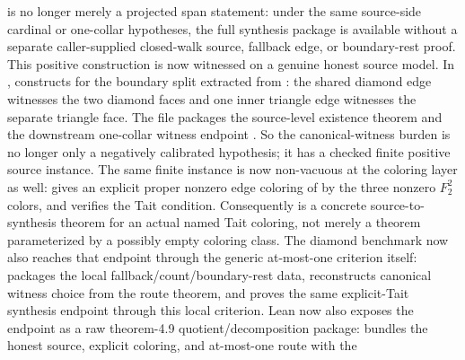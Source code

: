 \documentclass[11pt]{article}
\begin{document}
is no longer merely a projected span statement: under the same source-side
cardinal or one-collar hypotheses, the full synthesis package is available
without a separate caller-supplied closed-walk source, fallback edge, or
boundary-rest proof.
This positive construction is now witnessed on a genuine honest source model.
In ,
 constructs
for the boundary split extracted from
: the shared diamond
edge witnesses the two diamond faces and one inner triangle edge witnesses the
separate triangle face.  The file packages the source-level existence theorem
and the downstream one-collar witness endpoint
.
So the canonical-witness burden is no longer only a negatively calibrated
hypothesis; it has a checked finite positive source instance.
The same finite instance is now non-vacuous at the coloring layer as well:
 gives an explicit proper nonzero
edge coloring of  by the three nonzero
\(F_2^2\) colors, and
 verifies the Tait condition.
Consequently
is a concrete source-to-synthesis theorem for an actual named Tait coloring,
not merely a theorem parameterized by a possibly empty coloring class.
The diamond benchmark now also reaches that endpoint through the generic
at-most-one criterion itself:
packages the local fallback/count/boundary-rest data,
reconstructs canonical witness choice from the route theorem, and
proves the same explicit-Tait synthesis endpoint through this local criterion.
Lean now also exposes the endpoint as a raw theorem-4.9 quotient/decomposition
package:
bundles the honest source, explicit coloring, and at-most-one route with the
\end{document}
